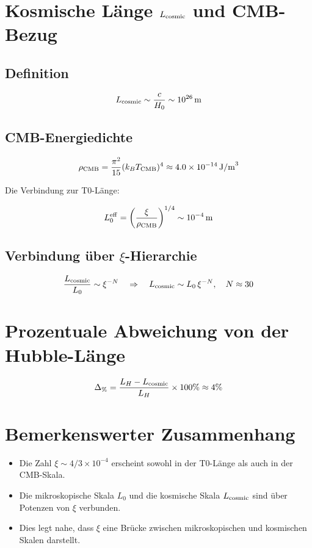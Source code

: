 \documentclass[12pt,a4paper]{article}
\begin{document}
	\section{Kosmische Länge $L_{\rm cosmic}$ und CMB-Bezug}
	
	\subsection{Definition}
	
	\[
	L_{\rm cosmic} \sim \frac{c}{H_0} \sim 10^{26}\,\text{m}
	\]
	
	\subsection{CMB-Energiedichte}
	
	\[
	\rho_{\rm CMB} = \frac{\pi^2}{15} (k_B T_{\rm CMB})^4 \approx 4.0 \times 10^{-14}\, \text{J/m}^3
	\]
	
	Die Verbindung zur T0-Länge:
	
	\[
	L_0^{\rm eff} = \left(\frac{\xi}{\rho_{\rm CMB}}\right)^{1/4} \sim 10^{-4}\,\text{m}
	\]
	
	\subsection{Verbindung über $\xi$-Hierarchie}
	
	\[
	\frac{L_{\rm cosmic}}{L_0} \sim \xi^{-N} \quad \Rightarrow \quad L_{\rm cosmic} \sim L_0 \, \xi^{-N}, \quad N \approx 30
	\]
	
	\section{Prozentuale Abweichung von der Hubble-Länge}
	
	\[
	\Delta_{\%} = \frac{L_H - L_{\rm cosmic}}{L_H} \times 100\% \approx 4\%
	\]
	
	\section{Bemerkenswerter Zusammenhang}
	
	\begin{itemize}
		\item Die Zahl $\xi \sim 4/3 \times 10^{-4}$ erscheint sowohl in der T0-Länge als auch in der CMB-Skala.
		\item Die mikroskopische Skala $L_0$ und die kosmische Skala $L_{\rm cosmic}$ sind über Potenzen von $\xi$ verbunden.
		\item Dies legt nahe, dass $\xi$ eine Brücke zwischen mikroskopischen und kosmischen Skalen darstellt.
	\end{itemize}
	
\end{document}

